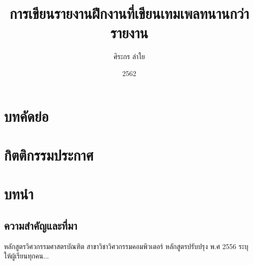 \documentclass[16pt,a4]{internshipreport}
\title{การเขียนรายงานฝึกงานที่เขียนเทมเพลทนานกว่ารายงาน}
\date{2562}
\author{ศิระกร ลำใย}
\begin{document}
\maketitle

\section*{บทคัดย่อ}
\lipsum[2-4]

\section*{กิตติกรรมประกาศ}
\lipsum[2-4]

\section{บทนำ}
\subsection{ความสำคัญและที่มา}
หลักสูตรวิศวกรรมศาสตรบัณฑิต สาขาวิชาวิศวกรรมคอมพิวเตอร์ หลักสูตรปรับปรุง พ.ศ 2556 ระบุให้ผู้เรียนทุกคน...
\lipsum[1]
\end{document}
